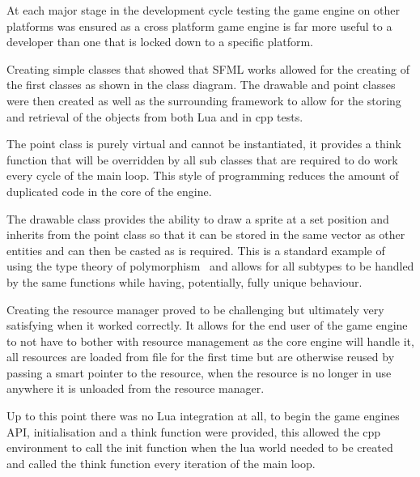 \documentclass[11pt,a4paper,titlepage]{article}
\begin{document}
    At each major stage in the development cycle testing the game engine on other platforms was ensured as a cross platform game engine is far more useful to a developer than one that is locked down to a specific platform.

    
    Creating simple classes that showed that SFML works allowed for the creating of the first classes as shown in the class diagram. The drawable and point classes were then created as well as the surrounding framework to allow for the storing and retrieval of the objects from both Lua and in cpp tests.

    The point class is purely virtual and cannot be instantiated, it provides a think function that will be overridden by all sub classes that are required to do work every cycle of the main loop. This style of programming reduces the amount of duplicated code in the core of the engine.

    The drawable class provides the ability to draw a sprite at a set position and inherits from the point class so that it can be stored in the same vector as other entities and can then be casted as is required. This is a standard example of using the type theory of polymorphism~\cite{PolymorphismDef} and allows for all subtypes to be handled by the same functions while having, potentially, fully unique behaviour.


    Creating the resource manager proved to be challenging but ultimately very satisfying when it worked correctly. It allows for the end user of the game engine to not have to bother with resource management as the core engine will handle it, all resources are loaded from file for the first time but are otherwise reused by passing a smart pointer to the resource, when the resource is no longer in use anywhere it is unloaded from the resource manager.


    Up to this point there was no Lua integration at all, to begin the game engines API, initialisation and a think function were provided, this allowed the cpp environment to call the init function when the lua world needed to be created and called the think function every iteration of the main loop.
\end{document}
